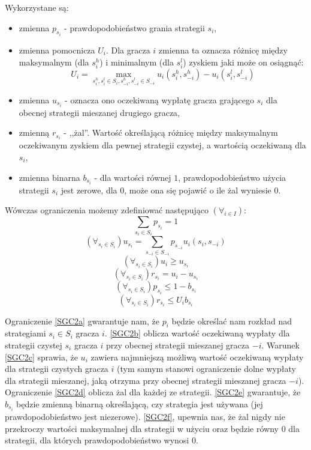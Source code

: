 \documentclass[polish]{standalone}
\begin{document}
Wykorzystane są: 
\begin{itemize}
\item zmienna $p_{s_i}$ - prawdopodobieństwo grania strategii $s_i$,
\item zmienna pomocnicza $U_i$. Dla gracza $i$ zmienna ta oznacza różnicę między maksymalnym (dla $s_i^h$) i minimalnym
(dla $s_i^l$) zyskiem jaki może on osiągnąć:
$$U_i = \max_{s_i^h, s_i^l \in S_i, s_{-i}^h, s_{-i}^l \in S_{-i}} u_i(s_i^h, s_{-i}^h) - u_i(s_i^l, s_{-i}^l)$$
\item zmienna $u_{s_i}$ - oznacza ono oczekiwaną wypłatę gracza grającego $s_i$ dla obecnej strategii mieszanej drugiego
gracza,
\item zmienną $r_{s_i}$ - ,,żal''. Wartość określającą różnicę między maksymalnym oczekiwanym zyskiem dla
pewnej strategii czystej, a wartością oczekiwaną dla $s_i$,
\item zmienna binarna $b_{s_i}$ - dla wartości równej $1$, prawdopodobieństwo użycia strategii $s_i$ jest zerowe,
dla $0$, może ona się pojawić o ile żal wyniesie $0$.
\end{itemize}

Wówczas ograniczenia możemy zdefiniować następująco $(\forall_{i \in I})$:
\begin{equation}
\sum_{{s_i} \in S_i} p_{s_i} = 1 \label{SGC2a}
\end{equation}
\begin{equation}
(\forall_{s_i \in S_i}) u_{s_i} = \sum_{s_{-i} \in S_{-i}} p_{s_{-i}} u_i(s_i, s_{-i}) \label{SGC2b}
\end{equation}
\begin{equation}
(\forall_{s_i \in S_i}) u_i \geq u_{s_i} \label{SGC2c}
\end{equation}
\begin{equation}
(\forall_{s_i \in S_i}) r_{s_i} = u_i - u_{s_i} \label{SGC2d}
\end{equation}
\begin{equation}
(\forall_{s_i \in S_i}) p_{s_i} \leq 1-b_{s_i} \label{SGC2e}
\end{equation}
\begin{equation}
(\forall_{s_i \in S_i}) r_{s_i} \leq U_i b_{s_i} \label{SGC2f}
\end{equation}

Ograniczenie \ref{SGC2a} gwarantuje nam, że $p_i$ będzie określać nam rozkład nad strategiami $s_i \in S_i$ gracza $i$.
\ref{SGC2b} oblicza wartość oczekiwaną wypłaty dla strategii czystej $s_i$ gracza $i$ przy obecnej strategii mieszanej
gracza $-i$. Warunek \ref{SGC2c} sprawia, że $u_i$ zawiera najmniejszą możliwą wartość oczekiwaną wypłaty dla strategii
czystych gracza $i$ (tym samym stanowi ograniczenie dolne wypłaty dla strategii mieszanej, jaką otrzyma przy obecnej
strategii mieszanej gracza $-i$). Ograniczenie \ref{SGC2d} oblicza żal dla każdej ze strategii. \ref{SGC2e} gwarantuje,
że $b_{s_i}$ będzie zmienną binarną określającą, czy strategia jest używana (jej prawdopodobieństwo jest niezerowe).
\ref{SGC2f}, upewnia nas, że żal nigdy nie przekroczy wartości maksymalnej dla strategii w użyciu oraz będzie równy $0$
dla strategii, dla których prawdopodobieństwo wynosi $0$.
\end{document}
